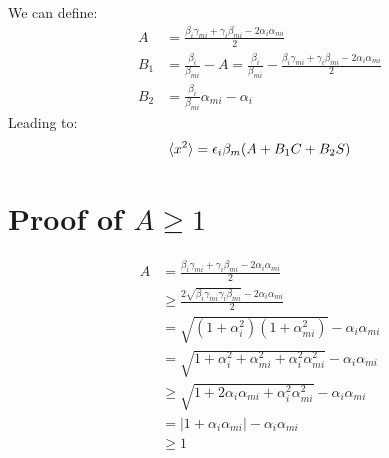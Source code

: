 \documentclass[%
reprint, superscriptaddress,
 amsmath,amssymb, aps,
prstab,
]{revtex4-2}
\begin{document}
 We can define: 
\begin{equation} 
\begin{aligned} A &= \frac{\beta_i
\gamma_{mi}+\gamma_i \beta_{mi}-2\alpha_i \alpha_{mi}}{2} \\ B_1 &=
\frac{\beta_i}{\beta_{mi}} - A = \frac{\beta_i}{\beta_{mi}}
-\frac{\beta_i \gamma_{mi}+\gamma_i \beta_{mi}-2\alpha_i \alpha_{mi}}{2}
\\ B_2 &= \frac{\beta_i}{\beta_{mi}}\alpha_{mi}-\alpha_i \end{aligned} 
\end{equation}
Leading to: \begin{equation} \braket{x^2} = \epsilon_i\beta_m(A + B_1 C +
B_2 S) \end{equation}

\section{Proof of $A \geqslant 1$} 
\begin{equation} \begin{aligned}
A &= \frac{\beta_i \gamma_{mi}+\gamma_i \beta_{mi}-2\alpha_i
\alpha_{mi}}{2} \\ & \geqslant \frac{2\sqrt{\beta_i \gamma_{mi}\gamma_i
\beta_{mi}}-2\alpha_i \alpha_{mi}}{2} \\ &=
\sqrt{(1+\alpha_i^2)(1+\alpha_{mi}^2)}-\alpha_i \alpha_{mi} \\ &=
\sqrt{1+\alpha_i^2 +\alpha_{mi}^2+ \alpha_i^2\alpha_{mi}^2 }-\alpha_i
\alpha_{mi} \\ & \geqslant \sqrt{1+2\alpha_i \alpha_{mi}+
\alpha_i^2\alpha_{mi}^2 }-\alpha_i \alpha_{mi} \\ & = |1+\alpha_i
\alpha_{mi} | -\alpha_i \alpha_{mi} \\ & \geqslant 1 \end{aligned}
\end{equation}
\end{document}
